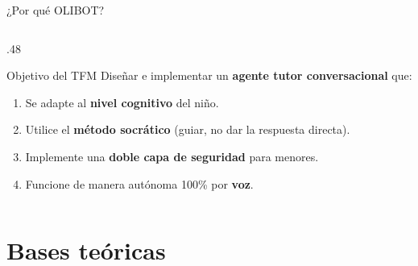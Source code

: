 \documentclass[aspectratio=169, 10pt]{beamer}
\begin{document}
\begin{frame}{¿Por qué OLIBOT?}
\begin{columns}[T]
\begin{column}{.48\textwidth}
\begin{alertblock}{Objetivo del TFM}
        Diseñar e implementar un \textbf{agente tutor conversacional} que:
        \begin{enumerate}
          \item Se adapte al \textbf{nivel cognitivo} del niño.
          \item Utilice el \textbf{método socrático} (guiar, no dar la respuesta directa).
          \item Implemente una \textbf{doble capa de seguridad} para menores.
          \item Funcione de manera autónoma 100\% por \textbf{voz}.
        \end{enumerate}
      \end{alertblock}
    \end{column}
  \end{columns}
\end{frame}

\section{Bases teóricas}
\end{document}
